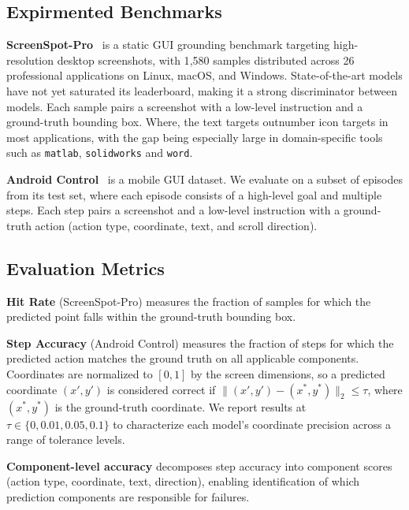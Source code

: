 \documentclass{article}
\theoremstyle{plain}
\theoremstyle{definition}
\theoremstyle{remark}
\begin{document}

\subsection{Expirmented Benchmarks}

\textbf{ScreenSpot-Pro}~\cite{li2025screenspotpro} is a static GUI grounding benchmark targeting high-resolution desktop screenshots, with 1{,}580 samples distributed across 26 professional applications on Linux, macOS, and Windows. State-of-the-art models have not yet saturated its leaderboard, making it a strong discriminator between models. Each sample pairs a screenshot with a low-level instruction and a ground-truth bounding box. Where, the text targets outnumber icon targets in most applications, with the gap being especially large in domain-specific tools such as \texttt{matlab}, \texttt{solidworks} and \texttt{word}.


\textbf{Android Control}~\cite{androidcontrol} is a mobile GUI dataset. We evaluate on a subset of episodes from its test set, where each episode consists of a high-level goal and multiple steps. Each step pairs a screenshot and a low-level instruction with a ground-truth action (action type, coordinate, text, and scroll direction).


\subsection{Evaluation Metrics}

\textbf{Hit Rate} (ScreenSpot-Pro) measures the fraction of samples for which the predicted point falls within the ground-truth bounding box.

\textbf{Step Accuracy} (Android Control) measures the fraction of steps for which the predicted action matches the ground truth on all applicable components. Coordinates are normalized to $[0, 1]$ by the screen dimensions, so a predicted coordinate $(x', y')$ is considered correct if $\|{(x', y') - (x^*, y^*)}\|_2 \leq \tau$,
where $(x^*, y^*)$ is the ground-truth coordinate. We report results at $\tau \in \{0, 0.01, 0.05, 0.1\}$ to characterize each model's coordinate precision across a range of tolerance levels.

\textbf{Component-level accuracy} decomposes step accuracy into component scores (action type, coordinate, text, direction), enabling identification of which prediction components are responsible for failures.
\end{document}
